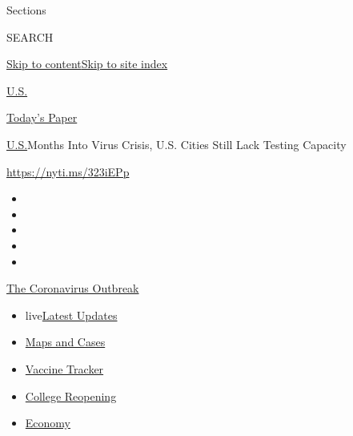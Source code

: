 Sections

SEARCH

\protect\hyperlink{site-content}{Skip to
content}\protect\hyperlink{site-index}{Skip to site index}

\href{https://www.nytimes.com/section/us}{U.S.}

\href{https://myaccount.nytimes.com/auth/login?response_type=cookie\&client_id=vi}{}

\href{https://www.nytimes.com/section/todayspaper}{Today's Paper}

\href{/section/us}{U.S.}\textbar{}Months Into Virus Crisis, U.S. Cities
Still Lack Testing Capacity

\url{https://nyti.ms/323iEPp}

\begin{itemize}
\item
\item
\item
\item
\item
\end{itemize}

\href{https://www.nytimes.com/news-event/coronavirus?action=click\&pgtype=Article\&state=default\&region=TOP_BANNER\&context=storylines_menu}{The
Coronavirus Outbreak}

\begin{itemize}
\tightlist
\item
  live\href{https://www.nytimes.com/2020/08/04/world/coronavirus-cases.html?action=click\&pgtype=Article\&state=default\&region=TOP_BANNER\&context=storylines_menu}{Latest
  Updates}
\item
  \href{https://www.nytimes.com/interactive/2020/us/coronavirus-us-cases.html?action=click\&pgtype=Article\&state=default\&region=TOP_BANNER\&context=storylines_menu}{Maps
  and Cases}
\item
  \href{https://www.nytimes.com/interactive/2020/science/coronavirus-vaccine-tracker.html?action=click\&pgtype=Article\&state=default\&region=TOP_BANNER\&context=storylines_menu}{Vaccine
  Tracker}
\item
  \href{https://www.nytimes.com/2020/08/02/us/covid-college-reopening.html?action=click\&pgtype=Article\&state=default\&region=TOP_BANNER\&context=storylines_menu}{College
  Reopening}
\item
  \href{https://www.nytimes.com/live/2020/08/04/business/stock-market-today-coronavirus?action=click\&pgtype=Article\&state=default\&region=TOP_BANNER\&context=storylines_menu}{Economy}
\end{itemize}

